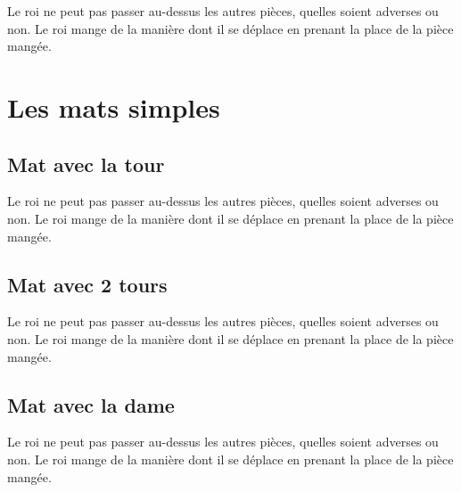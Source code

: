 \documentclass[a5paper,openany,twocolumn]{book}%
\begin{document}
Le roi ne peut pas passer au-dessus les autres pièces, quelles soient adverses ou non. Le roi mange de la manière dont il se déplace en prenant la place de la pièce mangée. 



\part{Les mats simples}


\chapter{Mat avec la tour}
 
Le roi ne peut pas passer au-dessus les autres pièces, quelles soient adverses ou non. Le roi mange de la manière dont il se déplace en prenant la place de la pièce mangée. 


\chapter{Mat avec 2 tours}
  
Le roi ne peut pas passer au-dessus les autres pièces, quelles soient adverses ou non. Le roi mange de la manière dont il se déplace en prenant la place de la pièce mangée. 

	
\chapter{Mat avec la dame}

Le roi ne peut pas passer au-dessus les autres pièces, quelles soient adverses ou non. Le roi mange de la manière dont il se déplace en prenant la place de la pièce mangée. 

\end{document}
